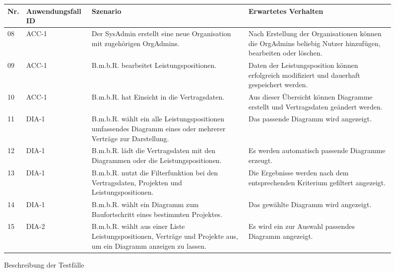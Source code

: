 \begin{figure}[!h]
	\begin{center}
		\begin{tabularx}{\textwidth}{ p{} | p{} | p{} | X }
			\textbf{Nr.} & \textbf{Anwendungsfall ID} & \textbf{Szenario} & \textbf{Erwartetes Verhalten} \\ \hline
			
			
			08 & ACC-1 & Der SysAdmin erstellt eine neue Organisation mit zugehörigen OrgAdmins. & Nach Erstellung der Organisationen können die OrgAdmins beliebig Nutzer hinzufügen, bearbeiten oder löschen. \\ \hline
			09 & ACC-1 & B.m.b.R. bearbeitet Leistungspositionen. & Daten der Leistungsposition können erfolgreich modifiziert und dauerhaft gespeichert werden. \\ \hline
			10 & ACC-1 & B.m.b.R. hat Einsicht in die Vertragsdaten. & Aus dieser Übersicht können Diagramme erstellt und Vertragsdaten geändert werden. \\ \hline
			11 & DIA-1 & B.m.b.R. wählt ein alle Leistungspositionen umfassendes Diagramm eines oder mehrerer Verträge zur Darstellung. & Das passende Diagramm wird angezeigt. \\ \hline 
			12 & DIA-1 & B.m.b.R. lädt die Vertragsdaten mit den Diagrammen oder die Leistungspositionen. & Es werden automatisch passende Diagramme erzeugt. \\ \hline
			13 & DIA-1 & B.m.b.R. nutzt die Filterfunktion bei den Vertragsdaten, Projekten und Leistungspositionen. & Die Ergebnisse werden nach dem entsprechenden Kriterium gefiltert angezeigt. \\ \hline
			14 & DIA-1 & B.m.b.R. wählt ein Diagramm zum Baufortschritt eines bestimmten Projektes. & Das gewählte Diagramm wird angezeigt.\\ \hline
			15 & DIA-2 & B.m.b.R. wählt aus einer Liste Leistungspositionen, Verträge und Projekte aus, um ein Diagramm anzeigen zu lassen.  & Es wird ein zur Auswahl passendes Diagramm angezeigt. \\ \hline 

		\end{tabularx}	
	\end{center}
	\caption{Beschreibung der Testfälle}
	\label{fig:testfaelle-mobile-app-tabelle}
\end{figure}